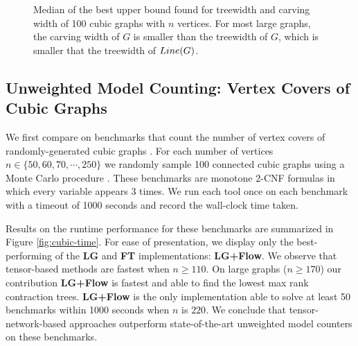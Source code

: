 \begin{figure}
	\centering
	
	\caption{\label{fig:vertex-cover-width} Median of the best upper bound found for treewidth and carving width of 100 cubic graphs with $n$ vertices. For most large graphs, the carving width of $G$ is smaller than the treewidth of $G$, which is smaller that the treewidth of $Line(G)$.}
\end{figure}

%	

%	

\subsection{Unweighted Model Counting: Vertex Covers of Cubic Graphs}
\label{sec:tensors:experiments:cubic}

We first compare on benchmarks that count the number of vertex covers of randomly-generated cubic graphs \cite{KCMR18}. For each number of vertices $n \in \{50, 60, 70, \cdots, 250\}$ we randomly sample 100 connected cubic graphs using a Monte Carlo procedure \cite{VL05}. These benchmarks are monotone 2-CNF formulas in which every variable appears 3 times. We run each tool once on each benchmark with a timeout of 1000 seconds and record the wall-clock time taken.

Results on the runtime performance for these benchmarks are summarized in Figure \ref{fig:cubic-time}. For ease of presentation, we display only the best-performing of the \textbf{LG} and \textbf{FT} implementations: \textbf{LG+Flow}. We observe that tensor-based methods are fastest when $n \geq 110$. On large graphs ($n \geq 170$) our contribution \textbf{LG+Flow} is fastest and able to find the lowest max rank contraction trees. \textbf{LG+Flow} is the only implementation able to solve at least 50 benchmarks within 1000 seconds when $n$ is $220$. We conclude that tensor-network-based approaches outperform state-of-the-art unweighted model counters on these benchmarks.

